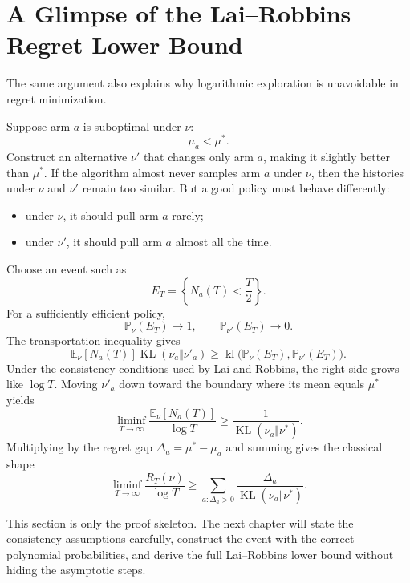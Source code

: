 \documentclass[en,nofont,11pt]{elegantbook}
\newcommand{\E}{\mathbb{E}}
\newcommand{\Pbb}{\mathbb{P}}
\newcommand{\KL}{\operatorname{KL}}
\newcommand{\kl}{\operatorname{kl}}
\begin{document}
\chapter{A Glimpse of the Lai--Robbins Regret Lower Bound}

The same argument also explains why logarithmic exploration is unavoidable in regret minimization.

Suppose arm $a$ is suboptimal under $\nu$:
\[
\mu_a<\mu^*.
\]
Construct an alternative $\nu'$ that changes only arm $a$, making it slightly better than $\mu^*$. If the algorithm almost never samples arm $a$ under $\nu$, then the histories under $\nu$ and $\nu'$ remain too similar. But a good policy must behave differently:

\begin{itemize}
\item under $\nu$, it should pull arm $a$ rarely;
\item under $\nu'$, it should pull arm $a$ almost all the time.
\end{itemize}

Choose an event such as
\[
E_T=\left\{N_a(T)<\frac{T}{2}\right\}.
\]
For a sufficiently efficient policy,
\[
\Pbb_\nu(E_T)\to1,
\qquad
\Pbb_{\nu'}(E_T)\to0.
\]
The transportation inequality gives
\begin{equation}
\E_\nu[N_a(T)]\KL(\nu_a\Vert\nu'_a)
\geq
\kl\bigl(\Pbb_\nu(E_T),\Pbb_{\nu'}(E_T)\bigr).
\label{eq:regret-preview}
\end{equation}
Under the consistency conditions used by Lai and Robbins, the right side grows like $\log T$. Moving $\nu'_a$ down toward the boundary where its mean equals $\mu^*$ yields
\begin{equation}
\liminf_{T\to\infty}
\frac{\E_\nu[N_a(T)]}{\log T}
\geq
\frac{1}{\KL(\nu_a\Vert\nu^*)}.
\label{eq:lai-robbins-pull-preview}
\end{equation}
Multiplying by the regret gap $\Delta_a=\mu^*-\mu_a$ and summing gives the classical shape
\begin{equation}
\liminf_{T\to\infty}
\frac{R_T(\nu)}{\log T}
\geq
\sum_{a:\Delta_a>0}
\frac{\Delta_a}{\KL(\nu_a\Vert\nu^*)}.
\label{eq:lai-robbins-preview}
\end{equation}

This section is only the proof skeleton. The next chapter will state the consistency assumptions carefully, construct the event with the correct polynomial probabilities, and derive the full Lai--Robbins lower bound without hiding the asymptotic steps.
\end{document}
